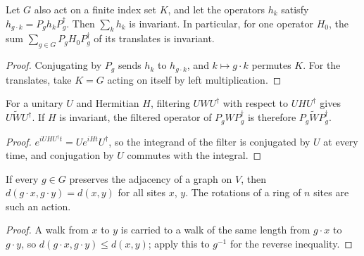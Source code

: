 \begin{lemma}
    \label{thm:hastings_site_invariant_sum}
    \leanok
    Let $G$ also act on a finite index set $K$, and let the operators $h_k$ satisfy
    $h_{g\cdot k}=P_gh_kP_g^\dagger$. Then $\sum_kh_k$ is invariant. In particular,
    for one operator $H_0$, the sum $\sum_{g\in G}P_gH_0P_g^\dagger$ of its
    translates is invariant.
\end{lemma}
\begin{proof}\leanok
    Conjugating by $P_g$ sends $h_k$ to $h_{g\cdot k}$, and $k\mapsto g\cdot k$
    permutes $K$. For the translates, take $K=G$ acting on itself by left
    multiplication.
\end{proof}

\begin{lemma}
    \label{thm:hastings_filtered_term_translate}
    \leanok
    For a unitary $U$ and Hermitian $H$, filtering $UWU^\dagger$ with respect to
    $UHU^\dagger$ gives $U\widetilde WU^\dagger$. If $H$ is invariant, the filtered
    operator of $P_gWP_g^\dagger$ is therefore $P_g\widetilde WP_g^\dagger$.
\end{lemma}
\begin{proof}\leanok
    $e^{iUHU^\dagger t}=Ue^{iHt}U^\dagger$, so the integrand of the filter is
    conjugated by $U$ at every time, and conjugation by $U$ commutes with the
    integral.
\end{proof}

\begin{lemma}
    \label{thm:hastings_site_action_distance}
    \leanok
    If every $g\in G$ preserves the adjacency of a graph on $V$, then
    $d(g\cdot x,g\cdot y)=d(x,y)$ for all sites $x$, $y$. The rotations of a ring
    of $n$ sites are such an action.
\end{lemma}
\begin{proof}\leanok
    A walk from $x$ to $y$ is carried to a walk of the same length from $g\cdot x$ to
    $g\cdot y$, so $d(g\cdot x,g\cdot y)\le d(x,y)$; apply this to $g^{-1}$ for the
    reverse inequality.
\end{proof}

